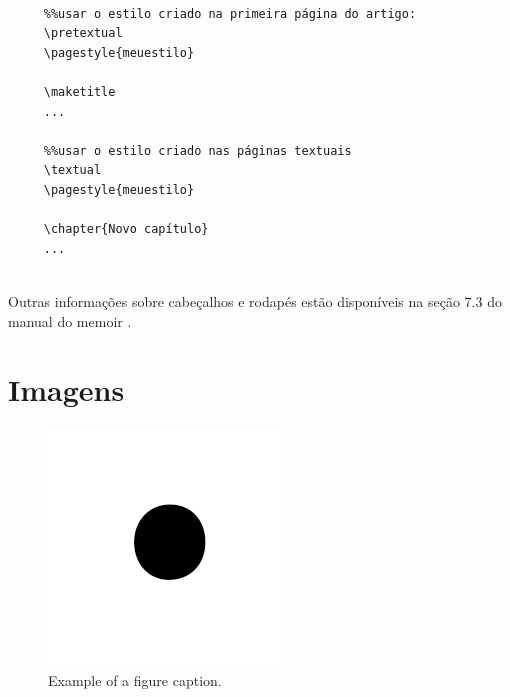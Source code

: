 \begin{verbatim}
   
     %%usar o estilo criado na primeira página do artigo:
     \pretextual
     \pagestyle{meuestilo}
     
     \maketitle
     ...
     
     %%usar o estilo criado nas páginas textuais
     \textual
     \pagestyle{meuestilo}
     
     \chapter{Novo capítulo}
     ...
     
\end{verbatim}

Outras informações sobre cabeçalhos e rodapés estão disponíveis na seção 7.3 do
manual do \textsf{memoir} \cite{memoir}.

\section{Imagens}
\begin{figure}[htbp]
   \centerline{
      \includegraphics*[scale=1.5]{imagens/fig1.png}
   }
   \caption{Example of a figure caption.}
   \label{fig}
\end{figure}




